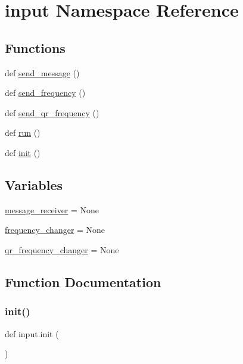 \hypertarget{namespaceinput}{}\section{input Namespace Reference}
\label{namespaceinput}
\subsection*{Functions}
\begin{DoxyCompactItemize}
\item 
def \hyperlink{namespaceinput_a93769ba24482b0fb5fb527f7e6b9e98f}{send\+\_\+message} ()
\item 
def \hyperlink{namespaceinput_a0e027bacb0e23962a92058b4de7df02d}{send\+\_\+frequency} ()
\item 
def \hyperlink{namespaceinput_a03ee62d50c865b3932ded679640747c9}{send\+\_\+qr\+\_\+frequency} ()
\item 
def \hyperlink{namespaceinput_acf8fe4c0bb6a777022f311c22f311770}{run} ()
\item 
def \hyperlink{namespaceinput_aea99d1687a0fd65c426df890f7c4e294}{init} ()
\end{DoxyCompactItemize}
\subsection*{Variables}
\begin{DoxyCompactItemize}
\item 
\hyperlink{namespaceinput_a9d4e412eda6375c7b27aeeccba8a2839}{message\+\_\+receiver} = None
\item 
\hyperlink{namespaceinput_ab769f6cd43885395710f5a098d8e890b}{frequency\+\_\+changer} = None
\item 
\hyperlink{namespaceinput_ac8b28af0ed72d501832d19897067fb3c}{qr\+\_\+frequency\+\_\+changer} = None
\end{DoxyCompactItemize}


\subsection{Function Documentation}
\mbox{\label{namespaceinput_aea99d1687a0fd65c426df890f7c4e294}} 
\subsubsection{\texorpdfstring{init()}{init()}}
{\footnotesize\ttfamily def input.\+init (\begin{DoxyParamCaption}{ }\end{DoxyParamCaption})}


